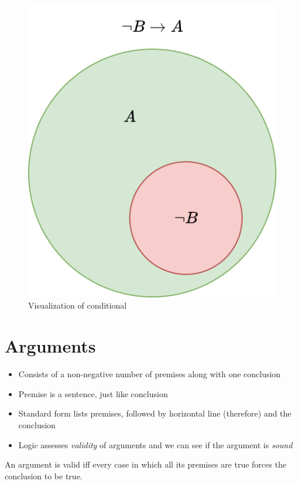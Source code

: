 \begin{figure}[H]
    \centering
    \includegraphics[scale=0.4]{figures/venn-conditional.png}
    \caption{Visualization of conditional}
\end{figure}

\section{Arguments}

\begin{itemize} 
    \item Consists of a non-negative number of premises along with one conclusion
    \item Premise is a sentence, just like conclusion
    \item Standard form lists premises, followed by horizontal line (therefore) and the conclusion
    \item Logic assesses \textit{validity} of arguments and we can see if the argument is \textit{sound}
\end{itemize}

\begin{definition}[Validity]
    An argument is valid iff every case in which all its premises are true forces the conclusion to be true.
\end{definition}

